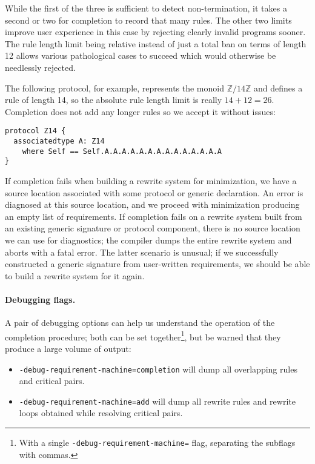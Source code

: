 \documentclass[../generics]{subfiles}
\begin{document}
While the first of the three is sufficient to detect non-termination, it takes a second or two for completion to record that many rules. The other two limits improve user experience in this case by rejecting clearly invalid programs sooner. The rule length limit being relative instead of just a total ban on terms of length 12 allows various pathological cases to succeed which would otherwise be needlessly rejected.

The following protocol, for example, represents the monoid $\mathbb{Z}/14\mathbb{Z}$ and defines a rule of length 14, so the absolute rule length limit is really $14+12=26$. Completion does not add any longer rules so we accept it without issues:
\begin{Verbatim}
protocol Z14 {
  associatedtype A: Z14
    where Self == Self.A.A.A.A.A.A.A.A.A.A.A.A.A.A
}
\end{Verbatim}

If completion fails when building a rewrite system for minimization, we have a source location associated with some protocol or generic declaration. An error is diagnosed at this source location, and we proceed with minimization producing an empty list of requirements. If completion fails on a rewrite system built from an existing generic signature or protocol component, there is no source location we can use for diagnostics; the compiler dumps the entire rewrite system and aborts with a fatal error. The latter scenario is unusual; if we successfully constructed a generic signature from user-written requirements, we should be able to build a rewrite system for it again.

\paragraph{Debugging flags.}
A pair of debugging options can help us understand the operation of the completion procedure; both can be set together\footnote{With a single \texttt{-debug-requirement-machine=} flag, separating the subflags with commas.}, but be warned that they produce a large volume of output:
\begin{itemize}
\item {} \texttt{-debug-requirement-machine=completion} will dump all overlapping rules and critical pairs.
\item {} \texttt{-debug-requirement-machine=add} will dump all rewrite rules and rewrite loops obtained while resolving critical pairs.
\end{itemize}
\end{document}
